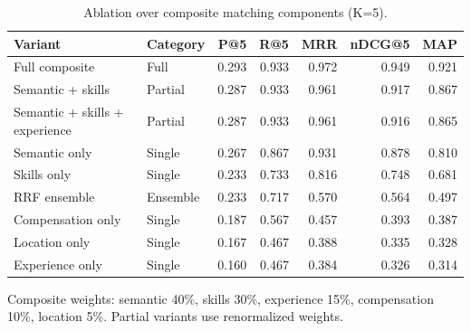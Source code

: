 \begin{table}[htbp]
\centering
\caption{Ablation over composite matching components (K=5).}
\label{tab:ablation}
\begin{tabular}{llrrrrr}
\toprule
Variant & Category & P@5 & R@5 & MRR & nDCG@5 & MAP \\
\midrule
Full composite & Full & 0.293 & 0.933 & 0.972 & 0.949 & 0.921 \\
Semantic + skills & Partial & 0.287 & 0.933 & 0.961 & 0.917 & 0.867 \\
Semantic + skills + experience & Partial & 0.287 & 0.933 & 0.961 & 0.916 & 0.865 \\
Semantic only & Single & 0.267 & 0.867 & 0.931 & 0.878 & 0.810 \\
Skills only & Single & 0.233 & 0.733 & 0.816 & 0.748 & 0.681 \\
RRF ensemble & Ensemble & 0.233 & 0.717 & 0.570 & 0.564 & 0.497 \\
Compensation only & Single & 0.187 & 0.567 & 0.457 & 0.393 & 0.387 \\
Location only & Single & 0.167 & 0.467 & 0.388 & 0.335 & 0.328 \\
Experience only & Single & 0.160 & 0.467 & 0.384 & 0.326 & 0.314 \\
\bottomrule
\end{tabular}
\footnotesize{Composite weights: semantic 40\%, skills 30\%, experience 15\%, compensation 10\%, location 5\%. Partial variants use renormalized weights.}
\end{table}

